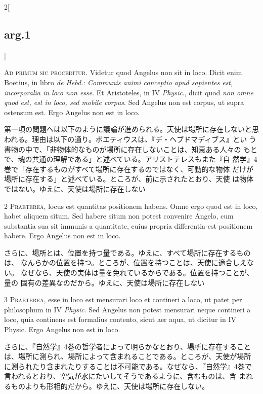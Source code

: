 \documentclass[paper=a4paper,fontsize=10pt,jafontsize=9pt,titlepage]{jlreq}
\begin{document}
\begin{paracol}{2}[\subsection{arg.1}]

{\huge A}{\scshape d primum sic proceditur}. Videtur quod Angelus non
 sit in loco. Dicit enim Boetius, in libro {\itshape de Hebd.}:
 {\itshape Communis animi conceptio apud sapientes est, incorporalia in
 loco non esse}. Et Aristoteles, in IV {\itshape Physic}., dicit quod
 {\itshape non omne quod est, est in loco, sed mobile corpus}. Sed
 Angelus non est corpus, ut supra ostensum est. Ergo Angelus non est in
 loco.

\switchcolumn

第一項の問題へは以下のように議論が進められる。天使は場所に存在しないと思
 われる。理由は以下の通り。ボエティウスは、『デ・ヘブドマディブス』とい
 う書物の中で、「非物体的なものが場所に存在しないことは、知恵ある人々の
 もとで、魂の共通の理解である」と述べている。アリストテレスもまた『自
 然学』4巻で「存在するものがすべて場所に存在するのではなく、可動的な物体
 だけが場所に存在する」と述べている。ところが、前に示されたとおり、天使
 は物体ではない。ゆえに、天使は場所に存在しない

\switchcolumn*

2 {\scshape Praeterea}, locus est quantitas positionem habens. Omne ergo
 quod est in loco, habet aliquem situm. Sed habere situm non potest
 convenire Angelo, cum substantia sua sit immunis a quantitate, cuius
 propria differentia est positionem habere. Ergo Angelus non est in
 loco.

\switchcolumn

さらに、場所とは、位置を持つ量である。ゆえに、すべて場所に存在するものは、
 なんらかの位置を持つ。ところが、位置を持つことは、天使に適合しえない。
 なぜなら、天使の実体は量を免れているからである。位置を持つことが、量の
 固有の差異なのだから。ゆえに、天使は場所に存在しない

\switchcolumn*

3 {\scshape Praeterea}, esse in loco est mensurari loco et contineri a
 loco, ut patet per philosophum in IV {\itshape Physic}. Sed Angelus non potest
 mensurari neque contineri a loco, quia continens est formalius
 contento, sicut aer aqua, ut dicitur in IV Physic. Ergo Angelus non est
 in loco.

\switchcolumn

さらに、『自然学』4巻の哲学者によって明らかなとおり、場所に存在すること
 は、場所に測られ、場所によって含まれることである。ところが、天使が場所
 に測られたり含まれたりすることは不可能である。なぜなら、『自然学』4巻で
 言われるとおり、空気が水にたいしてそうであるように、含むものは、含
 まれるものよりも形相的だから。ゆえに、天使は場所に存在しない。


\end{paracol}
\end{document}
